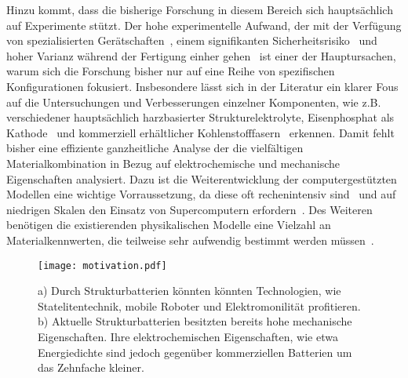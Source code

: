 Hinzu kommt, dass die bisherige Forschung in diesem Bereich sich hauptsächlich auf Experimente stützt. Der hohe experimentelle Aufwand, der mit der Verfügung von spezialisierten Gerätschaften~\cite{Fam2024,Duffner2020,LancerosMendez2018}, einem signifikanten Sicherheitsrisiko~\cite{Shirshova2021,Larsson2017,OuldEly2019,Chen2021} und hoher Varianz während der Fertigung einher gehen~\cite{Siraj2023,Schnell2019,Kenney2012} ist einer der Hauptursachen, warum sich die Forschung bisher nur auf eine Reihe von spezifischen Konfigurationen fokusiert. Insbesondere lässt sich in der Literatur ein klarer Fous auf die Untersuchungen und Verbesserungen einzelner Komponenten, wie z.B. verschiedener hauptsächlich harzbasierter Strukturelektrolyte, Eisenphosphat als Kathode~\cite{Chaudhary2024} und kommerziell erhältlicher Kohlenstofffasern~\cite{Johansen2024,Zenkert2024} erkennen. Damit fehlt bisher eine effiziente ganzheitliche Analyse der die vielfältigen Materialkombination in Bezug auf elektrochemische und mechanische Eigenschaften analysiert. %
Dazu ist die Weiterentwicklung der computergestützten Modellen eine wichtige Vorraussetzung, da diese oft rechenintensiv sind~\cite{Plett2015,Carlstedt2018} und auf niedrigen Skalen den Einsatz von Supercomputern erfordern~\cite{Giessen2020,Katrasnik2021}. Des Weiteren benötigen die existierenden physikalischen Modelle eine Vielzahl an Materialkennwerten, die teilweise sehr aufwendig bestimmt werden müssen~\cite{Carlstedt2019a,Carlstedt2022}.

\begin{figure}[ht]
        \center
	\texttt{[image: motivation.pdf]}
		\caption{\label{fig:motivation} a) Durch Strukturbatterien könnten könnten Technologien, wie Statelitentechnik, mobile Roboter und Elektromonilität profitieren. b) Aktuelle Strukturbatterien besitzten bereits hohe mechanische Eigenschaften. Ihre elektrochemischen Eigenschaften, wie etwa Energiedichte sind jedoch gegenüber kommerziellen Batterien um das Zehnfache kleiner.}
\end{figure}

